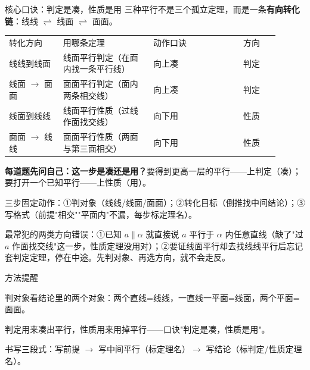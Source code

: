 \documentclass{exam-zh}
\begin{document}
\begin{eduSolutionBox}{核心口诀：判定是凑，性质是用}
  \begingroup
  \setlength{\parskip}{2.5mm}
三种平行不是三个孤立定理，而是一条\textbf{有向转化链}：线线 $\rightleftharpoons$ 线面 $\rightleftharpoons$ 面面。\par
\begin{tabular}{p{0.18\linewidth}p{0.30\linewidth}p{0.30\linewidth}p{0.12\linewidth}}
转化方向 & 用哪条定理 & 动作口诀 & 方向\\
线线到线面 & 线面平行判定（在面内找一条平行线） & 向上凑 & 判定\\
线面 $\to$ 面面 & 面面平行判定（面内两条相交线） & 向上凑 & 判定\\
线面到线线 & 线面平行性质（过线作面找交线） & 向下用 & 性质\\
面面 $\to$ 线线 & 面面平行性质（两面与第三面相交） & 向下用 & 性质\\
\end{tabular}
\par
\textbf{每道题先问自己：这一步是凑还是用？}要得到更高一层的平行——上判定（凑）；要打开一个已知平行——上性质（用）。\par
三步固定动作：①判对象（线线/线面/面面）；②转化目标（倒推找中间结论）；③写格式（前提"相交""平面内"不漏，每步标定理名）。\par
  \endgroup
\end{eduSolutionBox}




\begin{eduMistakeBox}
最常犯的两类方向错误：①已知 $a\parallel\alpha$ 就直接说 $a$ 平行于 $\alpha$ 内任意直线（缺了"过 $a$ 作面找交线"这一步，性质定理没用对）；②要证线面平行却去找线线平行后忘记套判定定理，停在中途。先判对象、再选方向，就不会走反。
\end{eduMistakeBox}




\begin{eduSummaryBlock}{\eduIconPin}{方法提醒}
\begin{eduBulletList}
  \item 判对象看结论里的两个对象：两个直线=线线，一直线一平面=线面，两个平面=面面。  \item 判定用来凑出平行，性质用来用掉平行——口诀"判定是凑，性质是用"。  \item 书写三段式：写前提 $\to$ 写中间平行（标定理名）$\to$ 写结论（标判定/性质定理名）。\end{eduBulletList}
\end{eduSummaryBlock}
\end{document}
